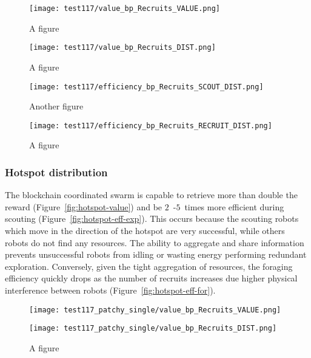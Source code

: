 \documentclass[runningheads]{llncs}
\begin{document}
\begin{figure}
\centering
\begin{minipage}{.495\textwidth}
  \centering
  \texttt{[image: test117/value\_bp\_Recruits\_VALUE.png]}
  \caption{A figure}
  \label{fig:abundant-value}
\end{minipage}
\begin{minipage}{.495\textwidth}
  \centering
  \texttt{[image: test117/value\_bp\_Recruits\_DIST.png]}
  \caption{A figure}
  \label{fig:abundant-dist}
\end{minipage}
\end{figure}

\begin{figure}
\centering
\begin{minipage}{.495\textwidth}
  \centering
  \texttt{[image: test117/efficiency\_bp\_Recruits\_SCOUT\_DIST.png]}
  \caption{Another figure}
  \label{fig:abundant-eff-exp}
\end{minipage}
\begin{minipage}{.495\textwidth}
  \centering
  \texttt{[image: test117/efficiency\_bp\_Recruits\_RECRUIT\_DIST.png]}
  \caption{A figure}
  \label{fig:abundant-eff-for}
\end{minipage}
\end{figure}

\subsubsection{Hotspot distribution}

The blockchain coordinated swarm is capable to retrieve more than double the reward (Figure~\ref{fig:hotspot-value}) and be $2$~-$5$~times more efficient during scouting (Figure~\ref{fig:hotspot-eff-exp}). This occurs because the scouting robots which move in the direction of the hotspot are very successful, while others robots do not find any resources. The ability to aggregate and share information prevents unsuccessful robots from idling or wasting energy performing redundant exploration. Conversely, given the tight aggregation of resources, the foraging efficiency quickly drops as the number of recruits increases due higher physical interference between robots (Figure~\ref{fig:hotspot-eff-for}).

\begin{figure}
\centering
\begin{minipage}{.495\textwidth}
  \centering
  \texttt{[image: test117\_patchy\_single/value\_bp\_Recruits\_VALUE.png]}
  \caption{}
  \label{fig:hotspot-value}
\end{minipage}
\begin{minipage}{.495\textwidth}
  \centering
  \texttt{[image: test117\_patchy\_single/value\_bp\_Recruits\_DIST.png]}
  \caption{A figure}
  \label{fig:hotspot-dist}
\end{minipage}
\end{figure}
\end{document}
